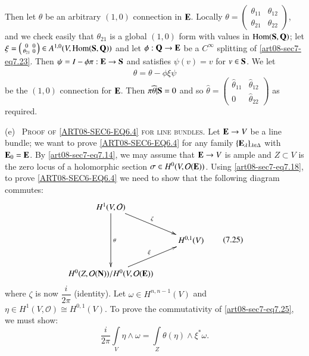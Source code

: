 Then let $\theta$ be an arbitrary $(1,0)$ connection in $\mathbf{E}$. Locally $\theta=\left(\begin{smallmatrix} \theta_{11} & \theta_{12}\\ \theta_{21} & \theta_{22}\end{smallmatrix}\right)$, and we check easily that $\theta_{21}$ is a global $(1,0)$ form with values in $\operatorname{\mathrm{Hom}}(\mathbf{S},\mathbf{Q})$; let $\xi=\left(\begin{smallmatrix} 0 & 0\\ \theta_{21} & 0\end{smallmatrix}\right)\in A^{1,0}(V,\operatorname{\mathrm{Hom}}(\mathbf{S},\mathbf{Q}))$ and let $\phi:\mathbf{Q}\to \mathbf{E}$ be a $C^{\infty}$ splitting of \eqref{art08-sec7-eq7.23}. Then $\psi=I-\phi\pi:\mathbf{E}\to \mathbf{S}$ and satisfies $\psi(v)=v$ for $v\in \mathbf{S}$. We let
\begin{equation*}
\widehat{\theta}=\theta-\phi\xi\psi\tag{7.24}\label{art08-sec7-eq7.24}
\end{equation*}
be the $(1,0)$ connection for $\mathbf{E}$. Then $\pi\widehat{\theta}|\mathbf{S}=0$ and so $\widehat{\theta}=\left(\begin{smallmatrix} \widehat{\theta}_{11} & \widehat{\theta}_{12}\\ 0 & \widehat{\theta}_{22}\end{smallmatrix}\right)$ as required.

(e)~ \textsc{Proof of \eqref{ART08-SEC6-EQ6.4} for line bundles.} Let $\mathbf{E}\to V$ be a line bundle; we want to prove \eqref{ART08-SEC6-EQ6.4} for any family $\{\mathbf{E}_{\lambda}\}_{\lambda\in \Delta}$ with $\mathbf{E}_{0}=\mathbf{E}$. By \eqref{art08-sec7-eq7.14}, we may assume that $\mathbf{E}\to V$ is ample and $Z\subset V$ is the zero locus of a holomorphic section $\sigma\in H^{0}(V,\mathcal{O}(\mathbf{E}))$. Using \eqref{art08-sec7-eq7.18}, to prove \eqref{ART08-SEC6-EQ6.4} we need to show that the following diagram commutes:
\begin{equation*}
\vcenter{\xymatrix{
H^{1}(V,\mathcal{O})\ar[dd]^-{\theta}\ar[dr]^-{\zeta} & \\
            & H^{0,1}(V)\\
H^{0}(Z,\mathcal{O}(\bfN))/H^{0}(V,\mathcal{O}(\bfE))\ar[ur]^{\xi} &
}}\tag{7.25}\label{art08-sec7-eq7.25}
\end{equation*}
where $\zeta$ is now $\dfrac{i}{2\pi}$ (identity). Let $\omega\in H^{n,n-1}(V)$ and $\eta\in H^{1}(V,\mathcal{O})\cong H^{0,1}(V)$. To prove the commutativity of \eqref{art08-sec7-eq7.25}, we must show:
\begin{equation*}
\frac{i}{2\pi}\int\limits_{V}\eta\wedge\omega=\int\limits_{Z}\theta(\eta)\wedge \xi^{*}\omega.\tag{7.26}\label{art08-sec7-eq7.26}
\end{equation*}

